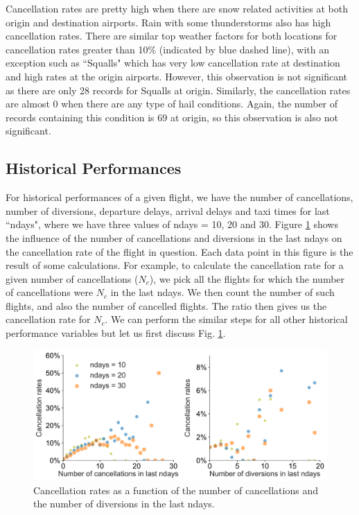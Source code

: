\documentclass[12pt]{article}
\begin{document}
Cancellation rates are pretty high when there are snow related activities at both origin and destination airports. Rain with some thunderstorms also has high cancellation rates. There are similar top weather factors for both locations for cancellation rates greater than 10$\%$ (indicated by blue dashed line), with an exception such as ``Squalls" which has very low cancellation rate at destination and high rates at the origin airports. However, this observation is not significant as there are only 28 records for Squalls at origin. Similarly, the cancellation rates are almost 0 when there are any type of hail conditions. Again, the number of records containing this condition is 69 at origin, so this observation is also not significant.
\subsection{Historical Performances}
\label{subsec:historical}
For historical performances of a given flight, we have the number of cancellations, number of diversions, departure delays, arrival delays and taxi times for last ``ndays", where we have three values of ndays = 10, 20 and 30. Figure \ref{fig:candivcanrate} shows the influence of the number of cancellations and diversions in the last ndays on the cancellation rate of the flight in question. Each data point in this figure is the result of some calculations. For example, to calculate the cancellation rate for a given number of cancellations ($N_c$), we pick all the flights for which the number of cancellations were $N_c$ in the last ndays. We then count the number of such flights, and also the number of cancelled flights. The ratio then gives us the cancellation rate for $N_c$. We can perform the similar steps for all other historical performance variables but let us first discuss Fig. \ref{fig:candivcanrate}.
\begin{figure}[h!]
\begin{center}
\includegraphics[width=6in]{candiv_canrate.pdf}
\end{center}
\caption{\label{fig:candivcanrate}
Cancellation rates as a function of the number of cancellations and the number of diversions in the last ndays.}
\end{figure}
\end{document}
